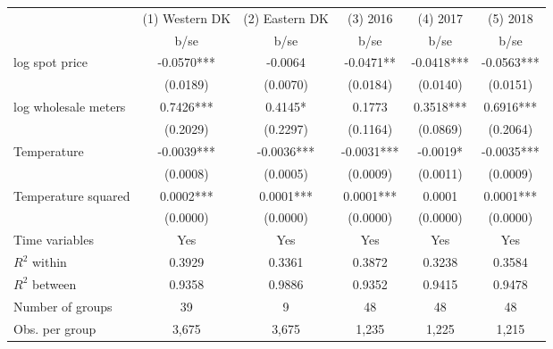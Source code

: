 \begin{tabular}{lccccc}\toprule
                    &(1) Western DK   &(2) Eastern DK   &    (3) 2016   &    (4) 2017   &    (5) 2018   \\
                    &        b/se   &        b/se   &        b/se   &        b/se   &        b/se   \\
\midrule
log spot price      &     -0.0570***&     -0.0064   &     -0.0471** &     -0.0418***&     -0.0563***\\
                    &    (0.0189)   &    (0.0070)   &    (0.0184)   &    (0.0140)   &    (0.0151)   \\
log wholesale meters&      0.7426***&      0.4145*  &      0.1773   &      0.3518***&      0.6916***\\
                    &    (0.2029)   &    (0.2297)   &    (0.1164)   &    (0.0869)   &    (0.2064)   \\
Temperature         &     -0.0039***&     -0.0036***&     -0.0031***&     -0.0019*  &     -0.0035***\\
                    &    (0.0008)   &    (0.0005)   &    (0.0009)   &    (0.0011)   &    (0.0009)   \\
Temperature squared &      0.0002***&      0.0001***&      0.0001***&      0.0001   &      0.0001***\\
                    &    (0.0000)   &    (0.0000)   &    (0.0000)   &    (0.0000)   &    (0.0000)   \\
Time variables      &         Yes   &         Yes   &         Yes   &         Yes   &         Yes   \\
\midrule
\(R^2\) within      &      0.3929   &      0.3361   &      0.3872   &      0.3238   &      0.3584   \\
\(R^2\) between     &      0.9358   &      0.9886   &      0.9352   &      0.9415   &      0.9478   \\
Number of groups    &          39   &           9   &          48   &          48   &          48   \\
Obs. per group      &       3,675   &       3,675   &       1,235   &       1,225   &       1,215   \\
\bottomrule\end{tabular}
